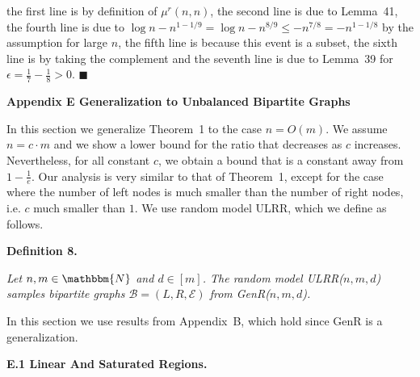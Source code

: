 \documentclass[10pt,a4paper]{article}
\begin{document}
the first line is by definition of $\mu^{r}(n,n)$, the second line is due to Lemma 41, the fourth line is due to $\log{n}-n^{1-1/9}=\log{n}-n^{8/9}\leq-n^{7/8}=-n^{1-1/8}$ by the assumption for large $n$, the fifth line is because this event is a subset, the sixth line is by taking the complement and the seventh line is due to Lemma 39 for $\epsilon=\frac{1}{7}-\frac{1}{8}>0$.
\ensuremath{\blacksquare}\par






\par\medskip\noindent\textbf{Appendix E Generalization to Unbalanced Bipartite Graphs}\par




In this section we generalize Theorem 1 to the case $n=O(m)$. We assume $n=c\cdot m$ and we show a lower bound for the ratio that decreases as $c$ increases. Nevertheless, for all constant $c$, we obtain a bound that is a constant away from $1-\frac{1}{e}$.
Our analysis is very similar to that of Theorem 1, except for the case where the number of left nodes is much smaller than the number of right nodes, i.e. $c$ much smaller than $1$.
We use random model ULRR, which we define as follows.\par





\par\medskip\noindent\textbf{\textbf{Definition 8}\textbf{.}}\par



\emph{Let $n,m\in\mathbbm{N}$ and $d\in[m]$. The random model ULRR($n,m,d$) samples bipartite graphs $\mathcal{B}=(L,R,\mathcal{E})$ from GenR($n,m,d$).}\par






In this section we use results from Appendix B, which hold since GenR is a generalization.\par




\par\medskip\noindent\textbf{E.1 Linear And Saturated Regions.}\par



\end{document}
